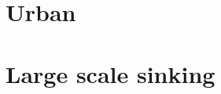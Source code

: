 \documentclass[a4paper]{report}
\begin{document}
\section{Urban}


%

\section{Large scale sinking}





\appendix





\end{document}
